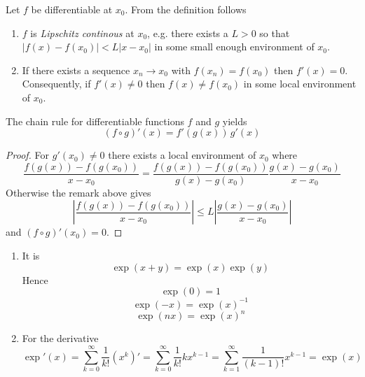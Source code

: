 \begin{remarks}Let \( f \) be differentiable at \( x_0 \). From the definition follows
    \begin{enumerate}
        \item \( f \) is \emph{Lipschitz continous} at \( x_0 \), e.g. there exists a \( L > 0 \) so that
              \( |f(x) - f(x_0)| < L|x - x_0| \) in some small enough environment of \( x_0 \).
        \item If there exists a sequence  \( x_n \to x_0 \) with \( f(x_n) = f(x_0) \) then \( f'(x) = 0 \).
              Consequently, if \( f'(x) \ne 0 \) then \( f(x) \ne f(x_0) \) in some local environment of \( x_0 \).
    \end{enumerate}
\end{remarks}
\bigskip

\begin{lemma}
    The chain rule for differentiable functions \( f \) and \( g \) yields
    \[
        (f \circ g)'(x) = f'(g(x))\, g'(x)
    \]

    \begin{proof}
        For \( g'(x_0) \ne 0 \) there exists a local environment of \( x_0 \) where
        \[
            \frac{f(g(x)) - f(g(x_0))}{x - x_0} =
            \frac{f(g(x)) - f(g(x_0))}{g(x) - g(x_0)} \frac{g(x) - g(x_0)}{x - x_0}
        \]
        Otherwise the remark above gives
        \[
            \left| \frac{f(g(x)) - f(g(x_0))}{x - x_0} \right| \le
            L\left| \frac{g(x) - g(x_0)}{x - x_0}  \right|
        \]
        and \( (f \circ g)'(x_0) = 0 \).
    \end{proof}
\end{lemma}
\bigskip


\begin{lemma}\hfill
    \begin{enumerate}
        \item It is
              \[
                  \exp(x + y) = \exp(x)\exp(y)
              \]
              Hence
              \[
                  \exp(0) = 1
              \]
              \[
                  \exp(-x) = {\exp(x)}^{-1}
              \]
              \[
                  \exp(nx) = {\exp(x)}^n
              \]
        \item For the derivative
              \[
                  \exp'(x) = \sum_{k=0}^\infty \frac{1}{k!} (x^k)' = \sum_{k=0}^\infty \frac{1}{k!} kx^{k-1}
                  = \sum_{k=1}^\infty \frac{1}{(k-1)!} x^{k-1} = \exp(x)
              \]
    \end{enumerate}
\end{lemma}
\bigskip


